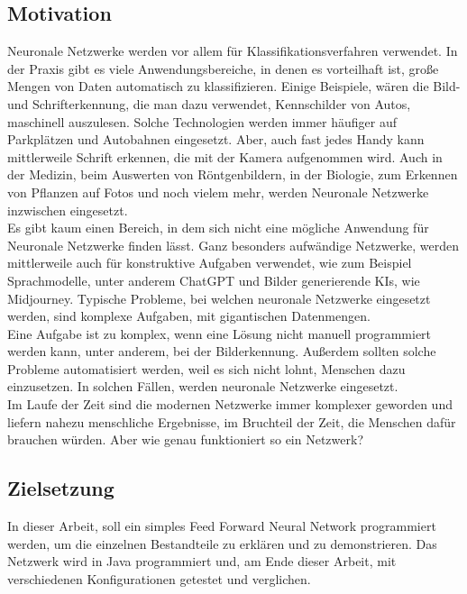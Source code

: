 \documentclass[12pt]{article}
\begin{document}
\subsection{Motivation}
Neuronale Netzwerke werden vor allem für Klassifikationsverfahren verwendet. In der Praxis gibt es viele Anwendungsbereiche, in denen es vorteilhaft ist, große Mengen von Daten automatisch zu klassifizieren. Einige Beispiele, wären die Bild- und Schrifterkennung, die man dazu verwendet, Kennschilder von Autos, maschinell auszulesen. Solche Technologien werden immer häufiger auf Parkplätzen und Autobahnen eingesetzt. Aber, auch fast jedes Handy kann mittlerweile Schrift erkennen, die mit der Kamera aufgenommen wird. Auch in der Medizin, beim Auswerten von Röntgenbildern, in der Biologie, zum Erkennen von Pflanzen auf Fotos und noch vielem mehr, werden Neuronale Netzwerke inzwischen eingesetzt.\\
Es gibt kaum einen Bereich, in dem sich nicht eine mögliche Anwendung für Neuronale Netzwerke finden lässt. Ganz besonders aufwändige Netzwerke, werden mittlerweile auch für konstruktive Aufgaben verwendet, wie zum Beispiel Sprachmodelle, unter anderem ChatGPT und Bilder generierende KIs, wie Midjourney.
Typische Probleme, bei welchen neuronale Netzwerke eingesetzt werden, sind komplexe Aufgaben, mit gigantischen Datenmengen.\\
Eine Aufgabe ist zu komplex, wenn eine Lösung nicht manuell programmiert werden kann, unter anderem, bei der Bilderkennung. Außerdem sollten solche Probleme automatisiert werden, weil es sich nicht lohnt, Menschen dazu einzusetzen. 
In solchen Fällen, werden neuronale Netzwerke eingesetzt.\\
Im Laufe der Zeit sind die modernen Netzwerke immer komplexer geworden und liefern nahezu menschliche Ergebnisse, im Bruchteil der Zeit, die Menschen dafür brauchen würden. Aber wie genau funktioniert so ein Netzwerk?
\subsection{Zielsetzung}
In dieser Arbeit, soll ein simples Feed Forward Neural Network programmiert werden, um die einzelnen Bestandteile zu erklären und zu demonstrieren. Das Netzwerk wird in Java programmiert und, am Ende dieser Arbeit, mit verschiedenen Konfigurationen getestet und verglichen.
\end{document}
